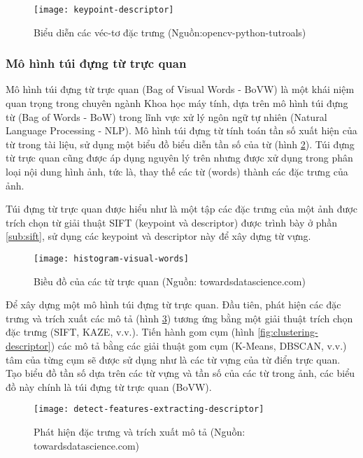 \begin{figure}[h]
	\centering
	\texttt{[image: keypoint-descriptor]}
	\caption[Biểu diễn các véc-tơ đặc trưng]{Biểu diễn các véc-tơ đặc trưng (Nguồn:opencv-python-tutroals)}
	\label{fig:kd}
\end{figure}	


\subsubsection{Mô hình túi đựng từ trực quan}
Mô hình túi đựng từ trực quan (Bag of Visual Words - BoVW) là một khái niệm quan trọng trong chuyên ngành Khoa học máy tính, dựa trên mô hình túi đựng từ (Bag of Words - BoW) trong lĩnh vực xử lý ngôn ngữ tự nhiên (Natural Language Processing - NLP). Mô hình túi đựng từ tính toán tần số xuất hiện của từ trong tài liệu, sử dụng một biểu đồ biểu diễn tần số của từ (hình \ref{fig:histogram-visual-words}). Túi đựng từ trực quan cũng được áp dụng nguyên lý trên nhưng được xử dụng trong phân loại nội dung hình ảnh, tức là, thay thế các từ (words) thành các đặc trưng của ảnh.\par

Túi đựng từ trực quan được hiểu như là một tập các đặc trưng của một ảnh được trích chọn từ giải thuật SIFT (keypoint và descriptor) được trình bày ở phần \ref{sub:sift}, sử dụng các keypoint và descriptor này để xây dựng từ vựng.\par

\begin{figure}[h]
	\centering
	\texttt{[image: histogram-visual-words]}
	\caption[Biều đồ của các từ trực quan]{Biều đồ của các từ trực quan (Nguồn: towardsdatascience.com)}
	\label{fig:histogram-visual-words}
\end{figure}	

Để xây dựng một mô hình túi đựng từ trực quan. Đầu tiên, phát hiện các đặc trưng và trích xuất các mô tả (hình \ref{fig:detect-features-extracting-descriptor}) tương ứng bằng một giải thuật trích chọn đặc trưng (SIFT, KAZE, v.v.). Tiến hành gom cụm (hình \ref{fig:clustering-descriptor}) các mô tả bằng các giải thuật gom cụm (K-Means, DBSCAN, v.v.) tâm của từng cụm sẽ được sử dụng như là các từ vựng của từ điển trực quan. Tạo biểu đồ tần số dựa trên các từ vựng và tần số của các từ trong ảnh, các biểu đồ này chính là túi đựng từ trực quan (BoVW).

\begin{figure}[h]
	\centering
	\texttt{[image: detect-features-extracting-descriptor]}
	\caption[Phát hiện đặc trưng và trích xuất mô tả]{Phát hiện đặc trưng và trích xuất mô tả (Nguồn: towardsdatascience.com)}
	\label{fig:detect-features-extracting-descriptor}
\end{figure}

